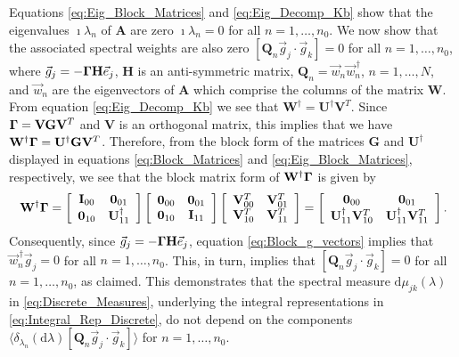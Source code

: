 \documentclass[11pt]{amsart}
\renewcommand{\d}{\mathrm{d}}
\newcommand{\Hb}{\mathbf{H}}
\newcommand{\Ib}{\mathbf{I}}
\newcommand{\Ab}{\mathbf{A}}
\newcommand{\Qb}{\mathbf{Q}}
\newcommand{\Ob}{\mathbf{0}}
\newcommand{\Vb}{\mathbf{V}}
\newcommand{\Wb}{\mathbf{W}}
\newcommand{\Gb}{\mathbf{G}}
\newcommand{\Ub}{\mathbf{U}}
\newcommand\bGamma{\mbox{\boldmath${\Gamma}$}}
\begin{document}
Equations \eqref{eq:Eig_Block_Matrices} and \eqref{eq:Eig_Decomp_Kb}
show that the eigenvalues $\imath\lambda_n$ of $\Ab$ are zero $\imath\lambda_n=0$ for all
$n=1,\ldots,n_0$. We now show that the associated spectral weights are also
zero $[\Qb_n\vec{g}_j\cdot\vec{g}_k]=0$ for all $n=1,\ldots,n_0$, where
$\vec{g}_j=-\bGamma\Hb\vec{e}_j$, $\Hb$ is an anti-symmetric matrix,
$\Qb_n=\vec{w}_n\vec{w}_n^{\,\dagger}$, $n=1,\ldots,N$, and $\vec{w}_n$ are the
eigenvectors of $\Ab$ which comprise the columns of the matrix
$\Wb$. From equation \eqref{eq:Eig_Decomp_Kb} we see that
$\Wb^\dagger=\Ub^\dagger\Vb^T$. Since $\bGamma=\Vb\Gb\Vb^T$ and $\Vb$ is an
orthogonal matrix, this implies that we have
$\Wb^\dagger\bGamma=\Ub^\dagger\Gb\Vb^T$. Therefore, from the block form of the
matrices $\Gb$ and $\Ub^\dagger$ displayed in equations
\eqref{eq:Block_Matrices} and \eqref{eq:Eig_Block_Matrices},
respectively, we see that the block matrix form of $\Wb^\dagger\bGamma$ is
given by    
%
\begin{align}\label{eq:Block_g_vectors}
%
\Wb^\dagger\bGamma
%
=\left[
  \begin{array}{ccc}
    \Ib_{00}&\Ob_{01}\\
    \Ob_{10}&\Ub_{11}^\dagger  
    \end{array}
\right]
\left[
  \begin{array}{ccc}
    \Ob_{00}&\Ob_{01}\\
    \Ob_{10}&\Ib_{11}   
    \end{array}
\right]
\left[
  \begin{array}{ccc}
    \Vb_{00}^T&\Vb_{01}^T\\
    \Vb_{10}^T&\Vb_{11}^T   
    \end{array}
\right]
=
\left[
  \begin{array}{ccc}
    \Ob_{00}&\Ob_{01}\\
    \Ub_{11}^\dagger\Vb_{10}^T &\Ub_{11}^\dagger\Vb_{11}^T   
    \end{array}
\right].
\end{align}
%
Consequently, since $\vec{g}_j=-\bGamma\Hb\vec{e}_j$, equation
\eqref{eq:Block_g_vectors} implies that $\vec{w}_n^{\,\dagger}\vec{g}_j=0$
for all $n=1,\ldots,n_0$. This, in turn, implies that
$[\Qb_n\vec{g}_j\cdot\vec{g}_k]=0$ for all $n=1,\ldots,n_0$, as claimed.  This
demonstrates that the spectral measure $\d\mu_{jk}(\lambda)$ in
\eqref{eq:Discrete_Measures}, underlying the integral representations
in \eqref{eq:Integral_Rep_Discrete}, do not depend on the components
$\langle\delta_{\lambda_n}(\d\lambda)[\Qb_n\vec{g}_j\cdot\vec{g}_k]\rangle$ for $n=1,\ldots,n_0$.
\end{document}
